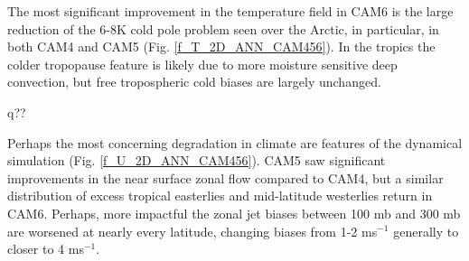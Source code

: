 The most significant improvement in the temperature field in CAM6 is the large reduction of the 6-8K cold pole problem seen over the Arctic, in particular, in both CAM4 and CAM5 (Fig. \ref{f_T_2D_ANN_CAM456}). In the tropics the colder tropopause feature is likely due to more moisture sensitive deep convection, but free tropospheric cold biases are largely unchanged. 

q??

Perhaps the most concerning degradation in climate are features of the dynamical simulation (Fig. \ref{f_U_2D_ANN_CAM456}). CAM5 saw significant improvements in the near surface zonal flow compared to CAM4, but a similar distribution of excess tropical easterlies and mid-latitude westerlies return in CAM6. Perhaps, more impactful the zonal jet biases between 100 mb and 300 mb are worsened at nearly every latitude, changing biases from 1-2 ms$^{-1}$ generally to closer to 4 ms$^{-1}$.